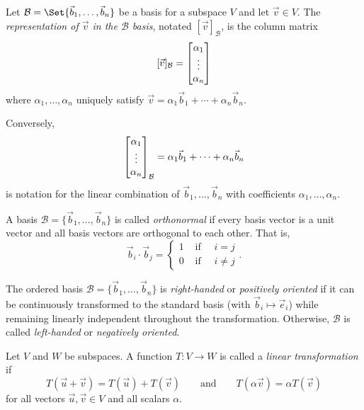 \begin{SaveDefinition}[
	key=RepresentationinaBasis,
	title={Representation in a Basis}]

	Let $\mathcal B=\Set{\vec b_1,\ldots,\vec b_n}$ be a basis for a
	subspace $V$ and let $\vec v\in V$. The
	\emph{representation of $\vec v$ in the $\mathcal B$ basis}, notated $[\vec
	v]_{\mathcal B}$, is the column matrix
	\[
		[\vec v]_{\mathcal B}= \begin{bmatrix}\alpha_1\\\vdots\\\alpha_n\end{bmatrix}
	\]
	 where $\alpha_{1},\ldots,\alpha_{n}$ uniquely satisfy
	$\vec v=\alpha_{1}\vec b_{1}+\cdots+\alpha_{n}\vec b_{n}.$

	Conversely,
	\[
		\begin{bmatrix}\alpha_1\\\vdots\\\alpha_n\end{bmatrix}_{\mathcal B}= \alpha_{1}\vec b_{1}+\cdots
		+\alpha_{n}\vec b_{n}
	\]
	 is notation for the linear combination of $\vec b_{1},\ldots,\vec b_{n}$
	with coefficients $\alpha_{1},\ldots,\alpha_{n}$.
\end{SaveDefinition}

\begin{SaveDefinition}[key=OrthonormalBasis, title={Orthonormal Basis}]
	A basis $\mathcal B=\{\vec b_{1},\ldots,\vec b_{n}\}$ is called
	\emph{orthonormal} if every basis vector is a unit vector and all
	basis vectors are orthogonal to each other. That is,
	\[
		\vec b_i\cdot \vec b_j=\begin{cases}
			1 &\text{ if }\quad i=j\\
			0 &\text{ if }\quad i\neq j
		\end{cases}.
	\]
\end{SaveDefinition}

\begin{SaveDefinition}[key=OrientationofaBasis, title={Orientation of a Basis}]
	The ordered basis $\mathcal B=\{\vec b_{1},\ldots,\vec b_{n}\}$ is
	\emph{right-handed} or
	\emph{positively oriented} if it can be continuously transformed to the
	standard basis (with $\vec b_{i}\mapsto \vec e_{i}$) while remaining
	linearly independent throughout the transformation. Otherwise,
	$\mathcal B$ is called
	\emph{left-handed} or
	\emph{negatively oriented}.
\end{SaveDefinition}

\begin{SaveDefinition}[key=LinearTransformation, title={Linear Transformation}]
	Let $V$ and $W$ be subspaces. A function $T:V\to W$ is called a
	\emph{linear transformation} if
	\[
		T(\vec u+\vec v)=T(\vec u)+T(\vec v) \qquad\text{and}\qquad T(\alpha
		\vec v)=\alpha T(\vec v)
	\]
	 for all vectors $\vec u,\vec v\in V$ and all scalars $\alpha$.
\end{SaveDefinition}


